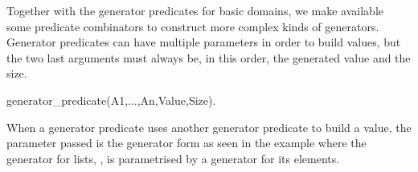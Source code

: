 Together with the generator predicates for basic domains, we make
available some predicate combinators to construct more complex kinds of
generators.
%
Generator predicates can have multiple parameters in order to build
values, but the two last arguments must always be, in this order, the
generated value and the size.
%
\begin{yapcode}
 generator_predicate(A1,...,An,Value,Size).
\end{yapcode}
%
When a generator predicate uses another generator predicate to build a
value, the parameter passed is the generator form as seen in the example
where the generator for lists, , is parametrised by a
generator for its elements.
%

\begin{yapcode}
\end{yapcode}

\begin{yapcode}
\end{yapcode}


\begin{yapcode}
\end{yapcode}

\begin{yapcode}
\end{yapcode}

